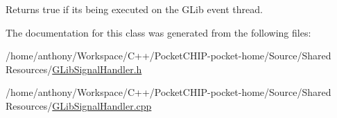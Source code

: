 Returns true if it\textquotesingle{}s being executed on the G\+Lib event thread. 

The documentation for this class was generated from the following files\+:\begin{DoxyCompactItemize}
\item 
/home/anthony/\+Workspace/\+C++/\+Pocket\+C\+H\+I\+P-\/pocket-\/home/\+Source/\+Shared Resources/\mbox{\hyperlink{GLibSignalHandler_8h}{G\+Lib\+Signal\+Handler.\+h}}\item 
/home/anthony/\+Workspace/\+C++/\+Pocket\+C\+H\+I\+P-\/pocket-\/home/\+Source/\+Shared Resources/\mbox{\hyperlink{GLibSignalHandler_8cpp}{G\+Lib\+Signal\+Handler.\+cpp}}\end{DoxyCompactItemize}
